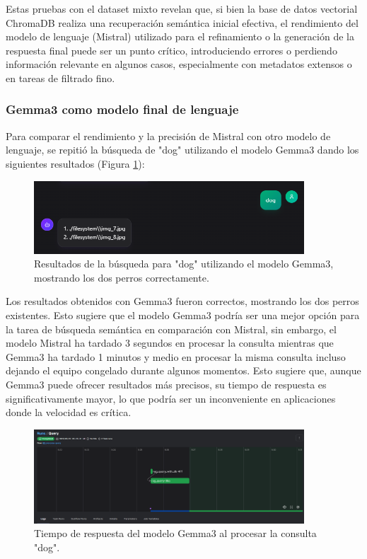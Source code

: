 Estas pruebas con el dataset mixto revelan que, si bien la base de datos vectorial ChromaDB realiza una recuperación semántica inicial efectiva, el rendimiento del modelo de lenguaje (Mistral) utilizado para el refinamiento o la generación de la respuesta final puede ser un punto crítico, introduciendo errores o perdiendo información relevante en algunos casos, especialmente con metadatos extensos o en tareas de filtrado fino.

\subsubsection{Gemma3 como modelo final de lenguaje}
\label{sec:gemma3_test}

Para comparar el rendimiento y la precisión de Mistral con otro modelo de lenguaje, se repitió la búsqueda de "dog" utilizando el modelo Gemma3 dando los siguientes resultados (Figura \ref{fig:gemma3_dogs_search_results}):
\begin{figure}[H]
\centering
\includegraphics[width=0.9\textwidth]{archivos/gemma3_dogs_result.png}
\caption[Resultados de búsqueda para "dog" con Gemma3]{Resultados de la búsqueda para "dog" utilizando el modelo Gemma3, mostrando los dos perros correctamente.}
\label{fig:gemma3_dogs_search_results}
\end{figure}

Los resultados obtenidos con Gemma3 fueron correctos, mostrando los dos perros existentes. Esto sugiere que el modelo Gemma3 podría ser una mejor opción para la tarea de búsqueda semántica en comparación con Mistral, sin embargo, el modelo Mistral ha tardado 3 segundos en procesar la consulta mientras que Gemma3 ha tardado 1 minutos y medio en procesar la misma consulta incluso dejando el equipo congelado durante algunos momentos. Esto sugiere que, aunque Gemma3 puede ofrecer resultados más precisos, su tiempo de respuesta es significativamente mayor, lo que podría ser un inconveniente en aplicaciones donde la velocidad es crítica.
\begin{figure}[H]
\centering
\includegraphics[width=0.9\textwidth]{archivos/gemma3_time.png}
\caption[Tiempo de respuesta de Gemma3]{Tiempo de respuesta del modelo Gemma3 al procesar la consulta "dog".}
\label{fig:gemma3_time}
\end{figure}

